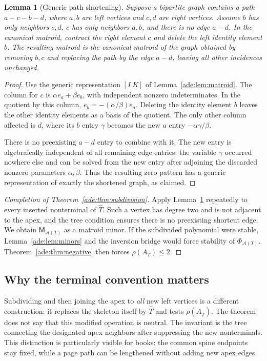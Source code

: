 \documentclass[11pt]{article}
\numberwithin{equation}{section}
\newtheorem{lemma}[theorem]{Lemma}
\theoremstyle{definition}
\newcommand{\calA}{\mathcal A}
\begin{document}
\begin{lemma}[Generic path shortening]
\label{ade:lem:shorten}
Suppose a bipartite graph contains a path
$a-c-b-d$, where $a,b$ are left vertices and $c,d$ are right vertices.
Assume $b$ has only neighbors $c,d$, $c$ has only neighbors $a,b$, and
there is no edge $a-d$.  In the canonical matroid, contract the right
element $c$ and delete the left identity element $b$.  The resulting
matroid is the canonical matroid of the graph obtained by removing $b,c$
and replacing the path by the edge $a-d$, leaving all other incidences
unchanged.
\end{lemma}
\begin{proof}
Use the generic representation $[I\ K]$ of
Lemma~\ref{ade:lem:matroid}.  The column for $c$ is
$\alpha e_a+\beta e_b$, with independent nonzero indeterminates.
In the quotient by this column,
$e_b=-(\alpha/\beta)e_a$.  Deleting the identity element $b$ leaves the
other identity elements as a basis of the quotient.  The only other
column affected is $d$, where its $b$ entry $\gamma$ becomes the new
$a$ entry $-\alpha\gamma/\beta$.

There is no preexisting $a-d$ entry to combine with it.  The new entry is
algebraically independent of all remaining edge entries: the variable
$\gamma$ occurred nowhere else and can be solved from the new entry after
adjoining the discarded nonzero parameters $\alpha,\beta$.
Thus the resulting zero pattern has a generic representation of exactly
the shortened graph, as claimed.
\end{proof}

\begin{proof}[Completion of Theorem~\ref{ade:thm:subdivision}]
Apply Lemma~\ref{ade:lem:shorten} repeatedly to every inserted nonterminal of
$\widehat T$.  Such a vertex has degree two and is not adjacent to the
apex, and the tree condition ensures there is no preexisting shortcut
edge.  We obtain $\mathsf M_{\calA(T)}$ as a matroid minor.  If the subdivided
polynomial were stable, Lemma~\ref{ade:lem:minors} and the inversion bridge
would force stability of $\Phi_{\calA(T)}$.  Theorem~\ref{ade:thm:negative}
then forces $\rho(A_T)\le2$.
\end{proof}

\subsection{Why the terminal convention matters}

Subdividing and then joining the apex to \emph{all} new left vertices is
a different construction: it replaces the skeleton itself by
$\widehat T$ and tests $\rho(A_{\widehat T})$.  The theorem does not say
that this modified operation is neutral.  The invariant is the tree
connecting the designated apex neighbors after suppressing the new
nonterminals.  This distinction is particularly visible for books: the
common spine endpoints stay fixed, while a page path can be lengthened
without adding new apex edges.
\end{document}
